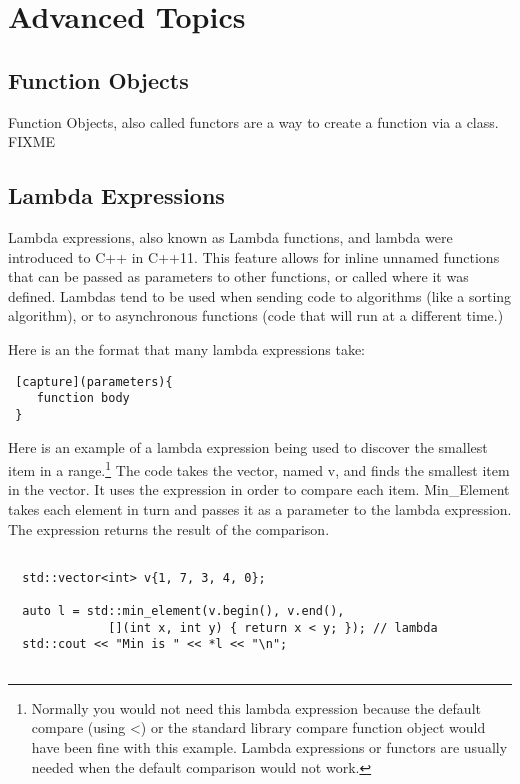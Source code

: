 
\chapter{Advanced Topics}

\section {Function Objects}
Function Objects, also called functors are a way to create a function via a class.
FIXME

\section{Lambda Expressions}
Lambda expressions, also known as Lambda functions, and lambda were introduced to C++ in C++11.
This feature allows for inline unnamed functions that can be passed as parameters to other functions, or called where it was defined. Lambdas tend to be used when sending code to algorithms (like a sorting algorithm), or to asynchronous functions (code that will run at a different time.)

Here is an the format that many lambda expressions take:
\begin{verbatim}
 [capture](parameters){
    function body
 }
\end{verbatim}

Here is an example of a lambda expression being used to discover the smallest item in a range.\footnote{Normally you would not need this lambda expression because the default compare (using \textless) or the standard library compare function object would have been fine with this example. Lambda expressions or functors are usually needed when the default comparison would not work.} The code takes the vector, named v, and finds the smallest
item in the vector. It uses the expression in order to compare each item. Min\_Element
takes each element in turn and passes it as a parameter to the lambda expression. The
expression returns the result of the comparison.

\begin{lstlisting}

  std::vector<int> v{1, 7, 3, 4, 0};

  auto l = std::min_element(v.begin(), v.end(), 
              [](int x, int y) { return x < y; }); // lambda
  std::cout << "Min is " << *l << "\n";
  
\end{lstlisting}

